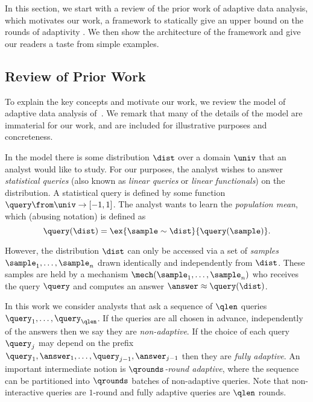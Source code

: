 In this section, we start with a review of the prior work of adaptive data analysis, which motivates our work, a framework to statically give an upper bound on the rounds of adaptivity . We then show the architecture of the framework and give our readers a taste from simple examples. 

\subsection{Review of Prior Work}

To explain the key concepts and motivate our work, we review the model of adaptive data analysis of~\cite{DworkFHPRR15,HU14}.  We remark that many of the details of the model are immaterial for our work, and are included for illustrative purposes and concreteness.  

In the model there is some distribution $\dist$ over a domain $\univ$ that an analyst would like to study.  For our purposes, the analyst wishes to answer \emph{statistical queries} (also known as \emph{linear queries} or \emph{linear functionals}) on the distribution.  A statistical query is defined by some function $\query \from \univ \to [-1,1]$.  The analyst wants to learn the \emph{population mean}, which (abusing notation) is defined as $$\query(\dist) = \ex{\sample \sim \dist}{\query(\sample)}.$$

However, the distribution $\dist$ can only be accessed via a set of \emph{samples} $\sample_1,\dots,\sample_n$ drawn identically and independently from $\dist$.  These samples are held by a mechanism $\mech(\sample_1,\dots,\sample_n)$ who receives the query $\query$ and computes an answer $\answer \approx \query(\dist)$.

In this work we consider analysts that ask a sequence of $\qlen$ queries $\query_1,\dots,\query_\qlen$.  If the queries are all chosen in advance, independently of the answers then we say they are \emph{non-adaptive}.  If the choice of each query $\query_j$ may depend on the prefix $\query_1,\answer_1,\dots,\query_{j-1},\answer_{j-1}$ then they are \emph{fully adaptive}.  An important intermediate notion is \emph{$\qrounds$-round adaptive}, where the sequence can be partitioned into $\qrounds$ batches of non-adaptive queries.  Note that non-interactive queries are $1$-round and fully adaptive queries are $\qlen$ rounds.

